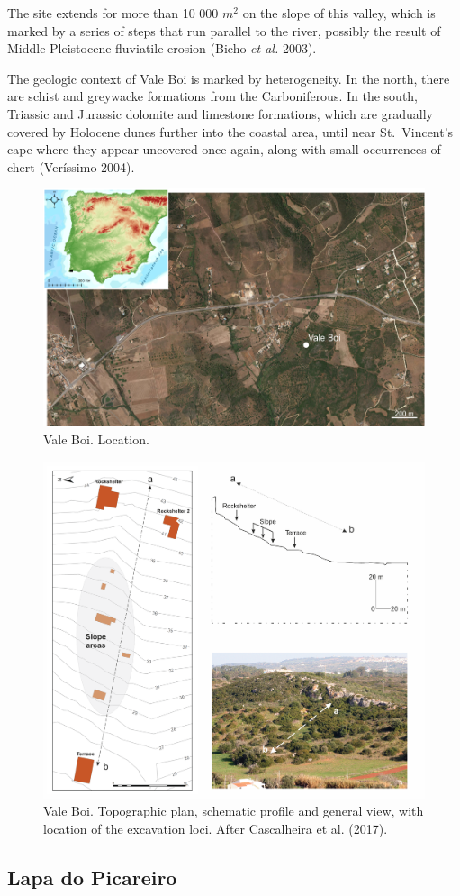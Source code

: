 \documentclass[12pt,twoside]{reedthesis}
\begin{document}
The site extends for more than 10 000 \(m^2\) on the slope of this valley, which is marked by a series of steps that run parallel to the river, possibly the result of Middle Pleistocene fluviatile erosion (Bicho \emph{et al.} 2003).

The geologic context of Vale Boi is marked by heterogeneity. In the north, there are schist and greywacke formations from the Carboniferous. In the south, Triassic and Jurassic dolomite and limestone formations, which are gradually covered by Holocene dunes further into the coastal area, until near St.~Vincent's cape where they appear uncovered once again, along with small occurrences of chert (Veríssimo 2004).
\begin{figure}

{\centering \includegraphics[width=0.6\linewidth]{figure/vale_boi_map} 

}

\caption{Vale Boi. Location.}\label{fig:vbmap}
\end{figure}
\begin{figure}

{\centering \includegraphics[width=0.6\linewidth]{figure/vb_plan} 

}

\caption{Vale Boi. Topographic plan, schematic profile and general view, with location of the excavation loci. After Cascalheira et al. (2017).}\label{fig:vbphoto}
\end{figure}
\hypertarget{lapa-do-picareiro}{%
\subsection{Lapa do Picareiro}\label{lapa-do-picareiro}}
\end{document}
